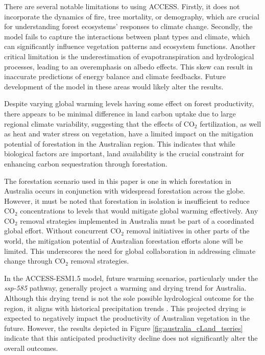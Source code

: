 \documentclass[]{article}
\begin{document}
There are several notable limitations to using ACCESS.
Firstly, it does not incorporate the dynamics of fire, tree mortality, or demography, which are crucial for understanding forest ecosystems' responses to climate change.
Secondly, the model fails to capture the interactions between plant types and climate, which can significantly influence vegetation patterns and ecosystem functions.
Another critical limitation is the underestimation of evapotranspiration and hydrological processes, leading to an overemphasis on albedo effects.
This skew can result in inaccurate predictions of energy balance and climate feedbacks.
Future development of the model in these areas would likely alter the results.

Despite varying global warming levels having some effect on forest productivity, there appears to be minimal difference in land carbon uptake due to large regional climate variability, suggesting that the effects of CO$_2$ fertilization, as well as heat and water stress on vegetation, have a limited impact on the mitigation potential of forestation in the Australian region.
This indicates that while biological factors are important, land availability is the crucial constraint for enhancing carbon sequestration through forestation.

The forestation scenario used in this paper is one in which forestation in Australia occurs in conjunction with widespread forestation across the globe.
However, it must be noted that forestation in isolation is insufficient to reduce CO$_2$ concentrations to levels that would mitigate global warming effectively.
Any CO$_2$ removal strategies implemented in Australia must be part of a coordinated global effort.
Without concurrent CO$_2$ removal initiatives in other parts of the world, the mitigation potential of Australian forestation efforts alone will be limited.
This underscores the need for global collaboration in addressing climate change through CO$_2$ removal strategies.

In the ACCESS-ESM1.5 model, future warming scenarios, particularly under the \textit{ssp-585} pathway, generally project a warming and drying trend for Australia.
Although this drying trend is not the sole possible hydrological outcome for the region, it aligns with historical precipitation trends \parencite{ziehn_australian_2020}.
This projected drying is expected to negatively impact the productivity of Australian vegetation in the future.
However, the results depicted in Figure \ref{fig:australia_cLand_tseries} indicate that this anticipated productivity decline does not significantly alter the overall outcomes.
\end{document}
